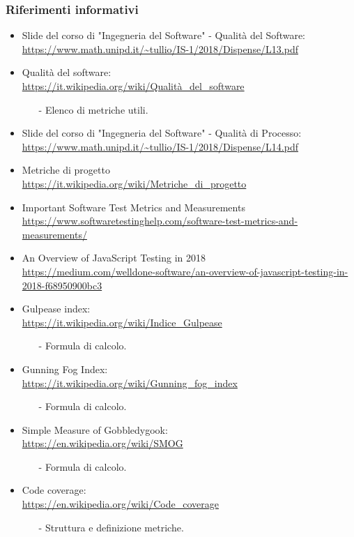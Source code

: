 \subsubsection{Riferimenti informativi}
 \begin{itemize}
 	\item Slide del corso di "Ingegneria del Software" - Qualità del Software: \\
		\url{https://www.math.unipd.it/~tullio/IS-1/2018/Dispense/L13.pdf} 
	\item Qualità del software: \\
		\url{https://it.wikipedia.org/wiki/Qualità_del_software}
		\begin{itemize}
			\item[-] Elenco di metriche utili.
		\end{itemize} 
	\item  Slide del corso di "Ingegneria del Software" - Qualità di Processo: \\
		\url{https://www.math.unipd.it/~tullio/IS-1/2018/Dispense/L14.pdf}
	\item Metriche di progetto \\
 		\url{https://it.wikipedia.org/wiki/Metriche_di_progetto}
 	\item Important Software Test Metrics and Measurements \\
 	    \url{https://www.softwaretestinghelp.com/software-test-metrics-and-measurements/}
 	\item An Overview of JavaScript Testing in 2018 \\  
 	    \url{https://medium.com/welldone-software/an-overview-of-javascript-testing-in-2018-f68950900bc3}
 	\item Gulpease index: \\
 		\url{https://it.wikipedia.org/wiki/Indice_Gulpease}
 	\begin{itemize}
 		\item[-] Formula di calcolo.
	\end{itemize}
	\item Gunning Fog Index: \\
		\url{https://it.wikipedia.org/wiki/Gunning_fog_index}
		\begin{itemize}
		\item[-] Formula di calcolo.
		\end{itemize}
	\item Simple Measure of Gobbledygook: \\  
		 \url{https://en.wikipedia.org/wiki/SMOG}
		 \begin{itemize}
		 	\item[-] Formula di calcolo.
		 \end{itemize}
	\item Code coverage: \\ 
		\url{https://en.wikipedia.org/wiki/Code_coverage}
		\begin{itemize}
		\item[-] Struttura e definizione metriche.
		\end{itemize}
\end{itemize}
